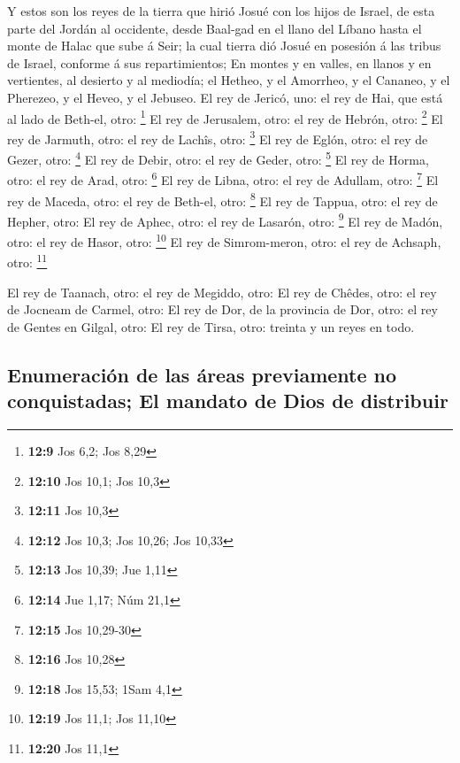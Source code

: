  Y estos son los reyes de la tierra que hirió Josué con los
hijos de Israel, de esta parte del Jordán al occidente, desde Baal-gad
en el llano del Líbano hasta el monte de Halac que sube á Seir; la cual
tierra dió Josué en posesión á las tribus de Israel, conforme á sus
repartimientos;  En montes y en valles, en llanos y en
vertientes, al desierto y al mediodía; el Hetheo, y el Amorrheo, y el
Cananeo, y el Pherezeo, y el Heveo, y el Jebuseo.  El rey de
Jericó, uno: el rey de Hai, que está al lado de Beth-el, otro:
\footnote{\textbf{12:9} Jos 6,2; Jos 8,29}  El rey de
Jerusalem, otro: el rey de Hebrón, otro: \footnote{\textbf{12:10} Jos
  10,1; Jos 10,3}  El rey de Jarmuth, otro: el rey de
Lachîs, otro: \footnote{\textbf{12:11} Jos 10,3}  El rey de
Eglón, otro: el rey de Gezer, otro: \footnote{\textbf{12:12} Jos 10,3;
  Jos 10,26; Jos 10,33}  El rey de Debir, otro: el rey de
Geder, otro: \footnote{\textbf{12:13} Jos 10,39; Jue 1,11} 
El rey de Horma, otro: el rey de Arad, otro: \footnote{\textbf{12:14}
  Jue 1,17; Núm 21,1}  El rey de Libna, otro: el rey de
Adullam, otro: \footnote{\textbf{12:15} Jos 10,29-30}  El
rey de Maceda, otro: el rey de Beth-el, otro: \footnote{\textbf{12:16}
  Jos 10,28}  El rey de Tappua, otro: el rey de Hepher,
otro:  El rey de Aphec, otro: el rey de Lasarón, otro:
\footnote{\textbf{12:18} Jos 15,53; 1Sam 4,1}  El rey de
Madón, otro: el rey de Hasor, otro: \footnote{\textbf{12:19} Jos 11,1;
  Jos 11,10}  El rey de Simrom-meron, otro: el rey de
Achsaph, otro: \footnote{\textbf{12:20} Jos 11,1}

 El rey de Taanach, otro: el rey de Megiddo, otro:
 El rey de Chêdes, otro: el rey de Jocneam de Carmel, otro:
 El rey de Dor, de la provincia de Dor, otro: el rey de
Gentes en Gilgal, otro:  El rey de Tirsa, otro: treinta y
un reyes en todo.

\hypertarget{enumeraciuxf3n-de-las-uxe1reas-previamente-no-conquistadas-el-mandato-de-dios-de-distribuir}{%
\subsection{Enumeración de las áreas previamente no conquistadas; El
mandato de Dios de
distribuir}\label{enumeraciuxf3n-de-las-uxe1reas-previamente-no-conquistadas-el-mandato-de-dios-de-distribuir}}

